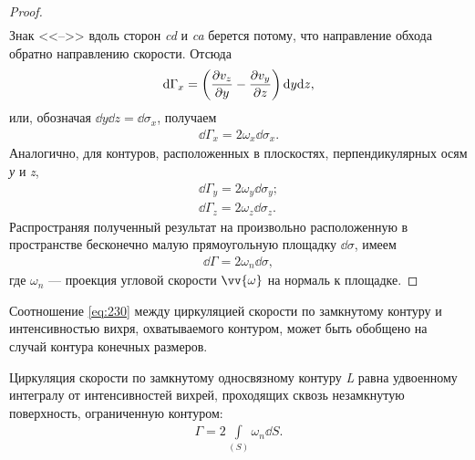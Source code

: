 \begin{proof}
\begin{gather*}
		\end{gather*}\n
		Знак <<-->> вдоль сторон \textit{cd} и \textit{ca} берется потому, что направление обхода обратно направлению скорости. Отсюда
		\begin{gather*}
			\mathrm{d}\Gamma_x = \left(\frac{\partial v_z}{\partial y} - \frac{\partial v_y}{\partial z}\right)\mathrm{d} y \mathrm{d} z,
		\end{gather*}
		или, обозначая $\dd y \dd z = \dd \sigma_x$, получаем
		\begin{gather}
			\dd\Gamma_x = 2\omega_x\dd\sigma_x.\label{eq:229а}
		\end{gather}\n
		Аналогично, для контуров, расположенных в плоскостях, перпендикулярных осям \textit{у} и \textit{z},
		\begin{gather}
			\dd\Gamma_y = 2\omega_y\dd\sigma_y;\label{eq:229б}\\
			\dd\Gamma_z = 2\omega_z\dd\sigma_z.\label{eq:229в}
		\end{gather}\n
		Распространяя полученный результат на произвольно расположенную в пространстве бесконечно малую прямоугольную площадку $\dd\sigma$, имеем
		\begin{gather}
			\dd \Gamma = 2 \omega_n \dd \sigma,\label{eq:230}
		\end{gather}
		где $\omega_n$ --- проекция угловой скорости $\vv{\omega}$ на нормаль к площадке.
	\end{proof}\n
	Соотношение \eqref{eq:230} между циркуляцией скорости по замкнутому контуру и интенсивностью вихря, охватываемого контуром, может быть обобщено на случай контура конечных размеров.
	\begin{theorem}\label{thm:Stokes-2}
		Циркуляция скорости по замкнутому односвязному контуру \textit{L} равна удвоенному интегралу от интенсивностей вихрей, проходящих сквозь незамкнутую поверхность, ограниченную контуром:
		\begin{gather*}
			\Gamma = 2 \int\limits_{\left(S\right)} \omega_n \dd S.
		\end{gather*}
	\end{theorem}
